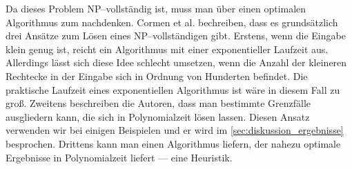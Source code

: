 Da dieses Problem NP--vollständig ist, muss man über einen optimalen Algorithmus zum
\fp{} nachdenken. 
Cormen et al. bechreiben, dass es grundsätzlich drei Ansätze zum Lösen eines
NP--vollständigen gibt.\cite[S.~1106]{cormen}
Erstens, wenn die Eingabe klein genug ist, reicht ein 
Algorithmus mit einer exponentieller Laufzeit aus.
Allerdings lässt sich diese Idee schlecht umsetzen,
wenn die Anzahl der kleineren Rechtecke in der Eingabe sich in Ordnung von Hunderten befindet.
Die praktische Laufzeit eines exponentiellen Algorithmus ist wäre in diesem Fall zu groß.
Zweitens beschreiben die Autoren,
dass man bestimmte Grenzfälle ausgliedern kann, die sich in Polynomialzeit lösen lassen.
Diesen Ansatz verwenden wir bei einigen Beispielen und er wird im \cref{sec:diskussion_ergebnisse}
besprochen.
Drittens kann man einen Algorithmus liefern, der nahezu optimale Ergebnisse 
in Polynomialzeit liefert --- eine Heuristik.



